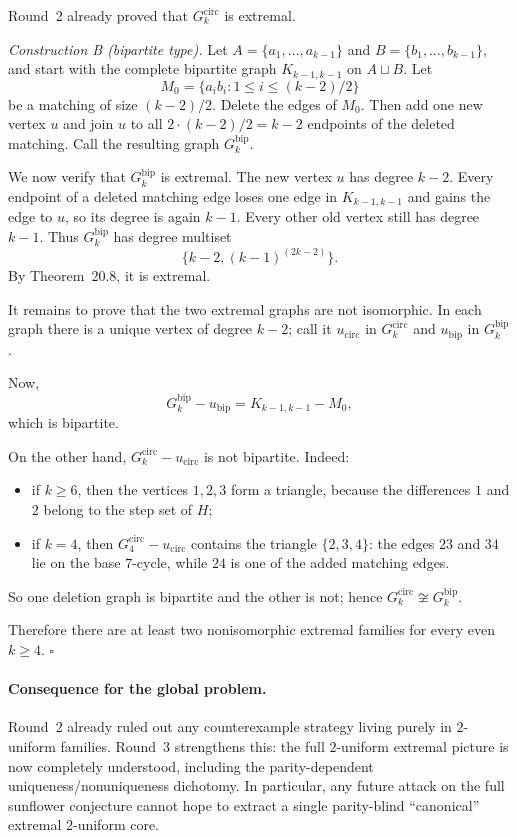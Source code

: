 Round~2 already proved that $G^{\mathrm{circ}}_k$ is extremal.

\smallskip
\noindent
\emph{Construction B (bipartite type).}
Let $A=\{a_1,\dots,a_{k-1}\}$ and $B=\{b_1,\dots,b_{k-1}\}$, and start with the complete bipartite graph $K_{k-1,k-1}$ on $A\sqcup B$. Let
\[
M_0=\{a_i b_i:1\le i\le (k-2)/2\}
\]
be a matching of size $(k-2)/2$. Delete the edges of $M_0$. Then add one new vertex $u$ and join $u$ to all $2\cdot (k-2)/2=k-2$ endpoints of the deleted matching.
Call the resulting graph $G^{\mathrm{bip}}_k$.

We now verify that $G^{\mathrm{bip}}_k$ is extremal. The new vertex $u$ has degree $k-2$. Every endpoint of a deleted matching edge loses one edge in $K_{k-1,k-1}$ and gains the edge to $u$, so its degree is again $k-1$. Every other old vertex still has degree $k-1$. Thus $G^{\mathrm{bip}}_k$ has degree multiset
\[
\{k-2,(k-1)^{(2k-2)}\}.
\]
By Theorem~20.8, it is extremal.

It remains to prove that the two extremal graphs are not isomorphic. In each graph there is a unique vertex of degree $k-2$; call it $u_{\mathrm{circ}}$ in $G^{\mathrm{circ}}_k$ and $u_{\mathrm{bip}}$ in $G^{\mathrm{bip}}_k$.

Now,
\[
G^{\mathrm{bip}}_k-u_{\mathrm{bip}}=K_{k-1,k-1}-M_0,
\]
which is bipartite.

On the other hand, $G^{\mathrm{circ}}_k-u_{\mathrm{circ}}$ is not bipartite. Indeed:
\begin{itemize}
\item if $k\ge 6$, then the vertices $1,2,3$ form a triangle, because the differences $1$ and $2$ belong to the step set of $H$;
\item if $k=4$, then $G^{\mathrm{circ}}_4-u_{\mathrm{circ}}$ contains the triangle $\{2,3,4\}$: the edges $23$ and $34$ lie on the base $7$-cycle, while $24$ is one of the added matching edges.
\end{itemize}
So one deletion graph is bipartite and the other is not; hence $G^{\mathrm{circ}}_k\not\cong G^{\mathrm{bip}}_k$.

Therefore there are at least two nonisomorphic extremal families for every even $k\ge 4$.
\hfill$\square$

\paragraph{Consequence for the global problem.}
Round~2 already ruled out any counterexample strategy living purely in $2$-uniform families. Round~3 strengthens this: the full $2$-uniform extremal picture is now completely understood, including the parity-dependent uniqueness/nonuniqueness dichotomy. In particular, any future attack on the full sunflower conjecture cannot hope to extract a single parity-blind ``canonical'' extremal $2$-uniform core.

